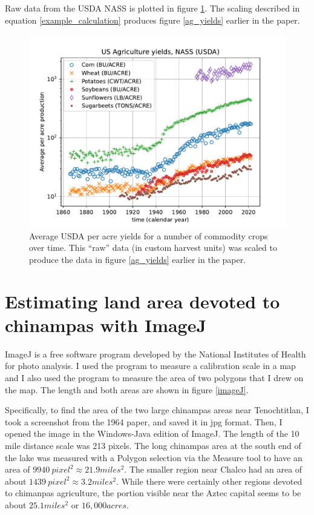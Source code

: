 \documentclass[prb,preprint]{revtex4-2}
\begin{document}
Raw data from the USDA NASS is plotted in figure \ref{raw_production_per_acre}.  The scaling described in equation \ref{example_calculation} produces figure \ref{ag_yields} earlier in the paper.
\begin{figure}[ht!]
\centering
\includegraphics[width=\columnwidth]{raw_production_per_acre.pdf}
\caption{
Average USDA per acre yields for a number of commodity crops over time.  This ``raw'' data (in custom harvest units) was scaled to produce the data in figure \ref{ag_yields} earlier in the paper. 
}
\label{raw_production_per_acre}
\end{figure}


\clearpage

\section{Estimating land area devoted to chinampas with ImageJ}
\label{appx_imageJ}

ImageJ is a free software program developed by the National Institutes of Health for photo analysis.\cite{imageJ}  I used the program to measure a calibration scale in a map and I also used the program to measure the area of two polygons that I drew on the map.  The length and both areas are shown in figure \ref{imageJ}.

Specifically, to find the area of the two large chinampas areas near Tenochtitlan, I took a screenshot from the 1964 paper,\cite{Chinampas_1964} and saved it in jpg format.  Then, I opened the image in the Windows-Java edition of ImageJ.\cite{imageJ}  The length of the 10 mile distance scale was 213 pixels. The long chinampas area at the south end of the lake was measured with a Polygon selection via the Measure tool to have an area of $9940~pixel^2\approx21.9miles^2$.  The smaller region near Chalco had an area of about $1439~pixel^2\approx3.2miles^2$.  While there were certainly other regions devoted to chimanpas agriculture, the portion visible near the Aztec capital seems to be about $25.1miles^2$ or $16,000acres$.  
\end{document}
